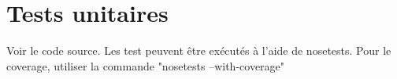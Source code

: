 \chapter{Tests unitaires}

Voir le code source.
Les test peuvent être exécutés à l'aide de nosetests.
Pour le coverage, utiliser la commande "nosetests --with-coverage"
